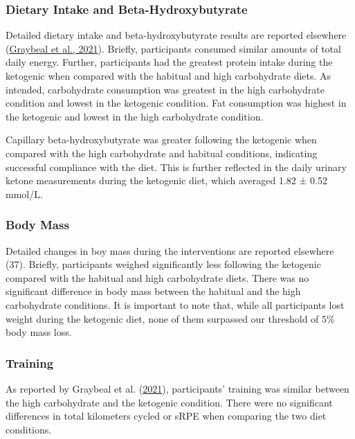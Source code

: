 \documentclass[]{cik}%
\begin{document}
\hypertarget{dietary-intake-and-beta-hydroxybutyrate}{%
\subsubsection{Dietary Intake and
Beta-Hydroxybutyrate}\label{dietary-intake-and-beta-hydroxybutyrate}}

Detailed dietary intake and beta-hydroxybutyrate results are reported
elsewhere (\protect\hyperlink{ref-37}{Graybeal et al., 2021}). Briefly,
participants consumed similar amounts of total daily energy. Further,
participants had the greatest protein intake during the ketogenic when
compared with the habitual and high carbohydrate diets. As intended,
carbohydrate consumption was greatest in the high carbohydrate condition
and lowest in the ketogenic condition. Fat consumption was highest in
the ketogenic and lowest in the high carbohydrate condition.

Capillary beta-hydroxybutyrate was greater following the ketogenic when
compared with the high carbohydrate and habitual conditions, indicating
successful compliance with the diet. This is further reflected in the
daily urinary ketone measurements during the ketogenic diet, which
averaged 1.82 ± 0.52 mmol/L.

\hypertarget{body-mass}{%
\subsubsection{Body Mass}\label{body-mass}}

Detailed changes in boy mass during the interventions are reported
elsewhere (37). Briefly, participants weighed significantly less
following the ketogenic compared with the habitual and high carbohydrate
diets. There was no significant difference in body mass between the
habitual and the high carbohydrate conditions. It is important to note
that, while all participants lost weight during the ketogenic diet, none
of them surpassed our threshold of 5\% body mass loss.

\hypertarget{training}{%
\subsubsection{Training}\label{training}}

As reported by Graybeal et al. (\protect\hyperlink{ref-37}{2021}),
participants' training was similar between the high carbohydrate and the
ketogenic condition. There were no significant differences in total
kilometers cycled or sRPE when comparing the two diet conditions.
\end{document}
